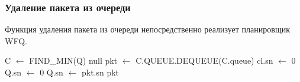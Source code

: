 		\subsubsection{Удаление пакета из очереди}

			Функция удаления пакета из очереди непосредственно реализует
			планировщик WFQ.

			\begin{algorithmic}[1]
					\State C $\gets$ FIND\_MIN(Q)
						\State \Return null
					\EndIf
					\State pkt $\gets$ C.QUEUE.DEQUEUE(C.queue)
						\State cl.sn $\gets$ 0
					\EndIf
						\State Q.sn $\gets$ 0
					\Else
    					\State Q.sn $\gets$ pkt.sn
					\EndIf
					\State \Return pkt 
				\EndFunction
			\end{algorithmic}

